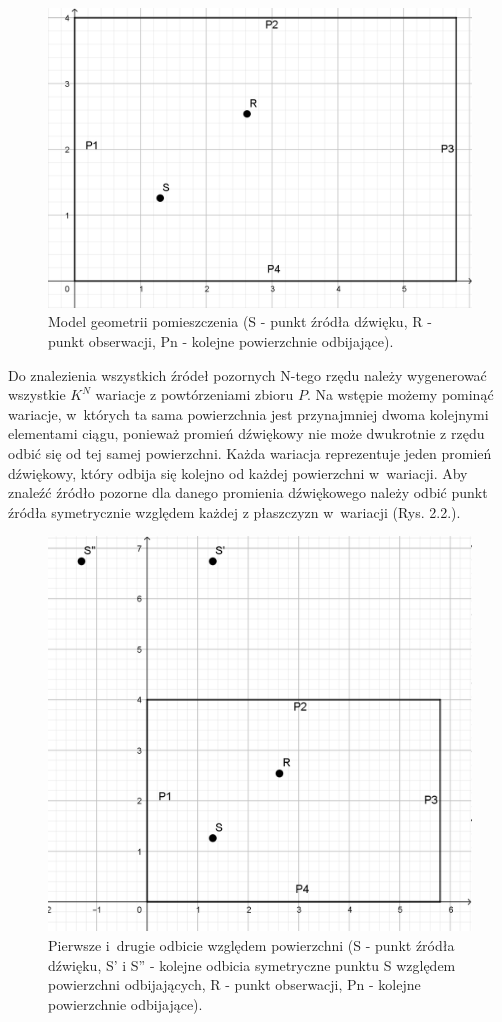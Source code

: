 \begin{figure}[H]
        \centering
                \centering
                \includegraphics[width=12cm]{rys1}
	\caption{Model geometrii pomieszczenia (S - punkt źródła dźwięku, R - punkt obserwacji, Pn - kolejne powierzchnie odbijające).}
\end{figure}

Do znalezienia wszystkich źródeł pozornych N-tego rzędu należy wygenerować wszystkie $K^N$ wariacje z powtórzeniami zbioru $P$. Na wstępie możemy pominąć wariacje, w~których ta sama powierzchnia jest przynajmniej dwoma kolejnymi elementami ciągu, ponieważ promień dźwiękowy nie może dwukrotnie z rzędu odbić się od tej samej powierzchni. Każda wariacja reprezentuje jeden promień dźwiękowy, który odbija się kolejno od każdej powierzchni w~wariacji. Aby znaleźć źródło pozorne dla danego promienia dźwiękowego należy odbić punkt źródła symetrycznie względem każdej z płaszczyzn w~wariacji (Rys. 2.2.). 

\begin{figure}[H]
        \centering
                \centering
                \includegraphics[width=12cm]{rys2}
	\caption{Pierwsze i~drugie odbicie względem powierzchni  (S - punkt źródła dźwięku, S' i S'' - kolejne odbicia symetryczne punktu S względem powierzchni odbijających, R - punkt obserwacji, Pn - kolejne powierzchnie odbijające).}
\end{figure}

